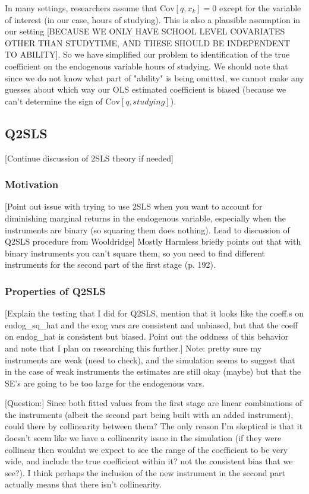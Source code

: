 \documentclass[12pt]{article}
\begin{document}
In many settings, researchers assume that $\mathrm{Cov}[q, x_k] = 0$ except for the variable of interest (in our case, hours of studying). This is also a plausible assumption in our setting \textcolor{BrickRed}{[BECAUSE WE ONLY HAVE SCHOOL LEVEL COVARIATES OTHER THAN STUDYTIME, AND THESE SHOULD BE INDEPENDENT TO ABILITY]}. So we have simplified our problem to identification of the true coefficient on the endogenous variable hours of studying. We should note that since we do not know what part of "ability" is being omitted, we cannot make any guesses about which way our OLS estimated coefficient is biased (because we can't determine the sign of $\mathrm{Cov}[q, studying]$).

\subsection{Q2SLS}
\textcolor{BrickRed}{[Continue discussion of 2SLS theory if needed]}

\subsubsection{Motivation}
\textcolor{BrickRed}{[Point out issue with trying to use 2SLS when you want to account for diminishing marginal returns in the endogenous variable, especially when the instruments are binary (so squaring them does nothing). Lead to discussion of Q2SLS procedure from Wooldridge]} Mostly Harmless briefly points out that with binary instruments you can't square them, so you need to find different instruments for the second part of the first stage (p. 192).

\subsubsection{Properties of Q2SLS}
\textcolor{BrickRed}{[Explain the testing that I did for Q2SLS, mention that it looks like the coeff.s on endog\_sq\_hat and the exog vars are consistent and unbiased, but that the coeff on endog\_hat is consistent but biased. Point out the oddness of this behavior and note that I plan on researching this further.]} Note: pretty sure my instruments are weak (need to check), and the simulation seems to suggest that in the case of weak instruments the estimates are still okay (maybe) but that the SE's are going to be too large for the endogenous vars.

\textcolor{BrickRed}{[Question:]} Since both fitted values from the first stage are linear combinations of the instruments (albeit the second part being built with an added instrument), could there by collinearity between them? The only reason I'm skeptical is that it doesn't seem like we have a collinearity issue in the simulation (if they were collinear then wouldnt we expect to see the range of the coefficient to be very wide, and include the true coefficient within it? not the consistent bias that we see?). I think perhaps the inclusion of the new instrument in the second part actually means that there isn't collinearity. 
\end{document}
